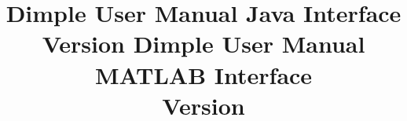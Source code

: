 \documentclass[11pt, oneside]{article}   	%
\title{\huge \bfseries Dimple User Manual \linebreak Java Interface \\ \normalfont \large Version \version}
\title{\huge \bfseries Dimple User Manual \linebreak MATLAB Interface \\ \normalfont \large Version \version}
\begin{document}
\maketitle




\clearpage
\setcounter{tocdepth}{5}				%
\tableofcontents

\clearpage







\begin{appendices}


\end{appendices}
\end{document}

